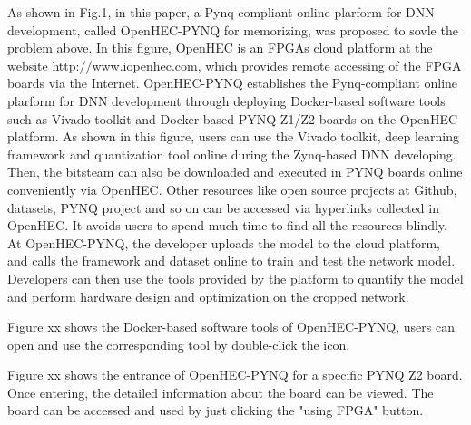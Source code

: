 As shown in Fig.1, in this paper, a Pynq-compliant online plarform for DNN development, called OpenHEC-PYNQ for memorizing, was proposed to sovle the problem above. In this figure, OpenHEC is an FPGAs cloud platform at the website http://www.iopenhec.com, which provides remote accessing of the FPGA boards via the Internet. OpenHEC-PYNQ establishes the Pynq-compliant online plarform for DNN development through deploying Docker-based software tools such as Vivado toolkit and Docker-based PYNQ Z1/Z2 boards on the OpenHEC platform. As shown in this figure, users can use the Vivado toolkit, deep learning framework and quantization tool online during the Zynq-based DNN developing. Then, the bitsteam can also be downloaded and executed in PYNQ boards online conveniently via OpenHEC.
Other resources like open source projects at Github, datasets, PYNQ project and so on can be accessed via hyperlinks collected in OpenHEC. It avoids users to spend much time to find all the resources blindly.
At OpenHEC-PYNQ, the developer uploads the model to the cloud platform, and calls the framework and dataset online to train and test the network model. Developers can then use the tools provided by the platform to quantify the model and perform hardware design and optimization on the cropped network.

Figure xx shows the Docker-based software tools of OpenHEC-PYNQ, users can open and use the corresponding tool by double-click the icon.

Figure xx shows the entrance of OpenHEC-PYNQ for a specific PYNQ Z2 board. Once entering, the detailed information about the board can be viewed. The board can be accessed and used by just clicking the "using FPGA" button.

